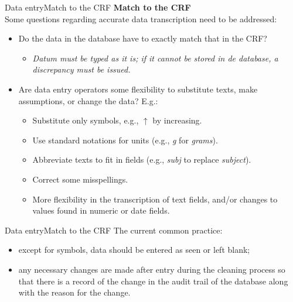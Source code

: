 \documentclass[xcolor=dvipsnames,11pt]{beamer}
\begin{document}
\begin{frame}[fragile]{Data entry}{Match to the CRF}
	\textbf{Match to the CRF}\\
	\bigskip
	Some questions regarding accurate data transcription need to be addressed:
	\begin{itemize}
		\item Do the data in the database have to \textcolor{PineGreen}{exactly} match that in the CRF?
		\begin{itemize}
			\item \textit{Datum must be typed as it is; if it cannot be stored in de database, a discrepancy must be issued.}
		\end{itemize}
		\item Are data entry operators some flexibility to substitute texts, make assumptions, or change the data? E.g.:
		\begin{itemize}
			\item Substitute only symbols, e.g., \textcolor{PineGreen}{$\uparrow$} by \textcolor{PineGreen}{increasing}.
			\item Use standard notations for units (e.g., \textit{g} for \textit{grams}).
			\item Abbreviate texts to fit in fields (e.g., \textit{subj} to replace \textit{subject}).
			\item Correct some misspellings.
			\item More flexibility in the transcription of text fields, and/or changes to values found in numeric or date fields.
		\end{itemize}
	\end{itemize}  
\end{frame}

\begin{frame}[fragile]{Data entry}{Match to the CRF}
	 \textcolor{PineGreen}{The current common practice:}
	\begin{itemize}
		\item except for symbols, data should be entered as seen or
		left blank;
		\item any necessary changes are made after entry during the cleaning process
		so that there is a record of the change in the audit trail of the database along with the
		reason for the change.
	\end{itemize}  
\end{frame}
\end{document}
